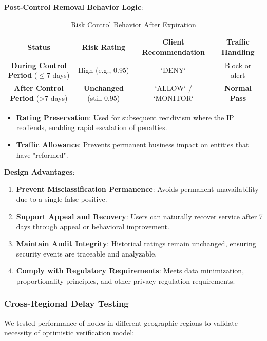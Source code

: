 \documentclass[12pt]{article}
\begin{document}
\textbf{Post-Control Removal Behavior Logic}:
\begin{table}[H]
\centering
\begin{tabular}{@{}cccc@{}}
\toprule
\textbf{Status} & \textbf{Risk Rating} & \textbf{Client Recommendation} & \textbf{Traffic Handling} \\
\midrule
\textbf{During Control Period} ($\leq$7 days) & High (e.g., 0.95) & `DENY` & Block or alert \\
\textbf{After Control Period} (>7 days) & \textbf{Unchanged} (still 0.95) & `ALLOW` / `MONITOR` & \textbf{Normal Pass} \\
\bottomrule
\end{tabular}
\caption{Risk Control Behavior After Expiration}
\label{tab:control_behavior}
\end{table}

\begin{itemize}
\item \textbf{Rating Preservation}: Used for subsequent recidivism where the IP reoffends, enabling rapid escalation of penalties.
\item \textbf{Traffic Allowance}: Prevents permanent business impact on entities that have "reformed".
\end{itemize}

\textbf{Design Advantages}:
\begin{enumerate}
\item \textbf{Prevent Misclassification Permanence}: Avoids permanent unavailability due to a single false positive.
\item \textbf{Support Appeal and Recovery}: Users can naturally recover service after 7 days through appeal or behavioral improvement.
\item \textbf{Maintain Audit Integrity}: Historical ratings remain unchanged, ensuring security events are traceable and analyzable.
\item \textbf{Comply with Regulatory Requirements}: Meets data minimization, proportionality principles, and other privacy regulation requirements.
\end{enumerate}

\subsubsection{Cross-Regional Delay Testing}

We tested performance of nodes in different geographic regions to validate necessity of optimistic verification model:
\end{document}
